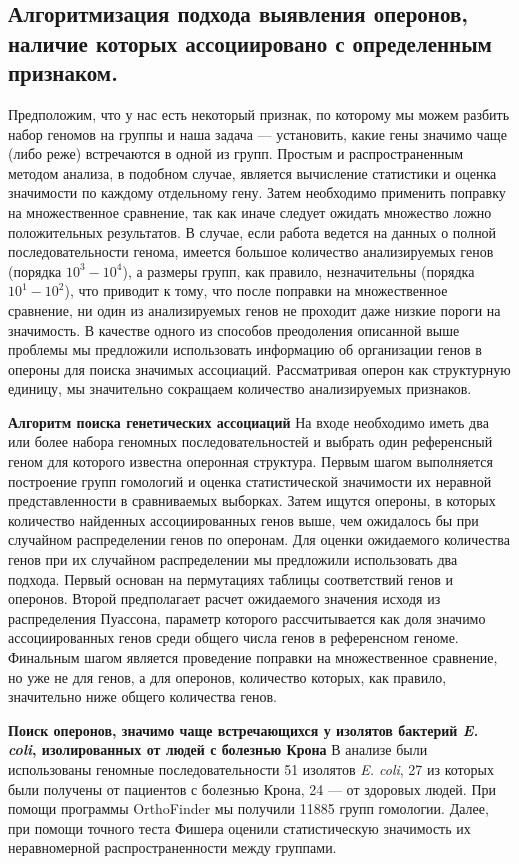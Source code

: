 \subsection*{Алгоритмизация подхода выявления оперонов, наличие которых ассоциировано с определенным признаком. } \label{chaptOperons}

Предположим, что у нас есть некоторый признак, по которому мы можем разбить набор геномов на группы и наша задача --- установить, какие гены значимо чаще (либо реже) встречаются в одной из групп. Простым и распространенным методом анализа, в подобном случае, является вычисление статистики и оценка значимости по каждому отдельному гену. Затем необходимо применить поправку на множественное сравнение, так как иначе следует ожидать множество ложно положительных результатов. В случае, если работа ведется на данных о полной последовательности генома, имеется большое количество анализируемых генов (порядка $10^3 - 10^4$), а размеры групп, как правило, незначительны (порядка $10^1 - 10^2$), что приводит к тому, что после поправки на множественное сравнение, ни один из анализируемых генов не проходит даже низкие пороги на значимость. В качестве одного из способов преодоления описанной выше проблемы мы предложили использовать информацию об организации генов в опероны для поиска значимых ассоциаций. Рассматривая оперон как структурную единицу, мы значительно сокращаем количество анализируемых признаков.

\textbf{Алгоритм поиска генетических ассоциаций}
На входе необходимо иметь два или более набора геномных последовательностей и выбрать один референсный геном для которого известна оперонная структура. Первым шагом выполняется построение групп гомологий и оценка статистической значимости их неравной представленности в сравниваемых выборках. Затем ищутся опероны, в которых количество найденных ассоциированных генов выше, чем ожидалось бы при случайном распределении генов по оперонам. Для оценки ожидаемого количества генов при их случайном распределении мы предложили использовать два подхода. Первый основан на пермутациях таблицы соответствий генов и оперонов. Второй предполагает расчет ожидаемого значения исходя из распределения Пуассона, параметр которого рассчитывается как доля значимо ассоциированных генов среди общего числа генов в референсном геноме. Финальным шагом является проведение поправки на множественное сравнение, но уже не для генов, а для оперонов, количество которых, как правило, значительно ниже общего количества генов. 

\textbf{Поиск оперонов, значимо чаще встречающихся у изолятов бактерий \textit{E. coli}, изолированных от людей с болезнью Крона}
В анализе были использованы геномные последовательности 51 изолятов \textit{E. coli}, 27 из которых были получены от пациентов с болезнью Крона, 24 --- от здоровых людей. При помощи программы OrthoFinder мы получили 11885 групп гомологии. Далее, при помощи точного теста Фишера оценили статистическую значимость их неравномерной распространенности между группами.  

